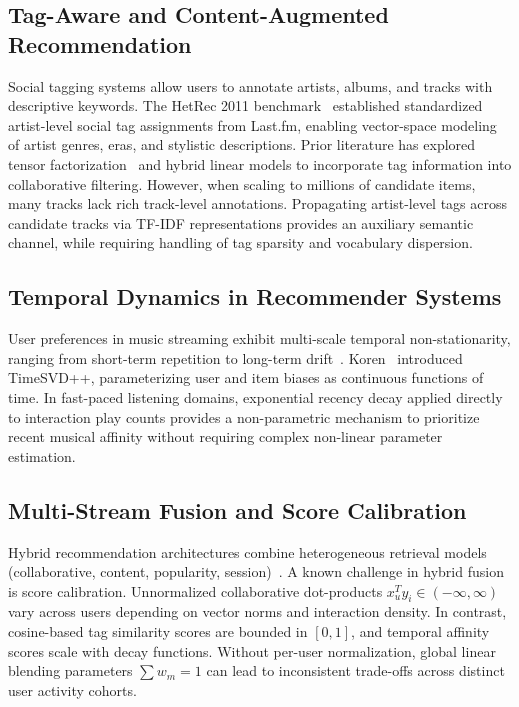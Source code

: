 \documentclass[conference]{IEEEtran}
\begin{document}
\subsection{Tag-Aware and Content-Augmented Recommendation}
Social tagging systems allow users to annotate artists, albums, and tracks with descriptive keywords. The HetRec 2011 benchmark~\cite{cantador2011hetrec} established standardized artist-level social tag assignments from Last.fm, enabling vector-space modeling of artist genres, eras, and stylistic descriptions. Prior literature has explored tensor factorization~\cite{rendle2012bpr} and hybrid linear models to incorporate tag information into collaborative filtering. However, when scaling to millions of candidate items, many tracks lack rich track-level annotations. Propagating artist-level tags across candidate tracks via TF-IDF representations provides an auxiliary semantic channel, while requiring handling of tag sparsity and vocabulary dispersion.

\subsection{Temporal Dynamics in Recommender Systems}
User preferences in music streaming exhibit multi-scale temporal non-stationarity, ranging from short-term repetition to long-term drift~\cite{koren2010collaborative}. Koren~\cite{koren2010collaborative} introduced TimeSVD++, parameterizing user and item biases as continuous functions of time. In fast-paced listening domains, exponential recency decay applied directly to interaction play counts provides a non-parametric mechanism to prioritize recent musical affinity without requiring complex non-linear parameter estimation.

\subsection{Multi-Stream Fusion and Score Calibration}
Hybrid recommendation architectures combine heterogeneous retrieval models (collaborative, content, popularity, session)~\cite{sarwar2001item}. A known challenge in hybrid fusion is score calibration. Unnormalized collaborative dot-products $x_u^T y_i \in (-\infty, \infty)$ vary across users depending on vector norms and interaction density. In contrast, cosine-based tag similarity scores are bounded in $[0, 1]$, and temporal affinity scores scale with decay functions. Without per-user normalization, global linear blending parameters $\sum w_m = 1$ can lead to inconsistent trade-offs across distinct user activity cohorts.
\end{document}
